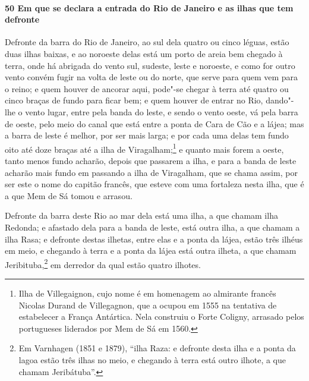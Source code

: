 \begin{linenumbers}
\paragraph{50 Em que se declara a entrada do Rio de Janeiro e as ilhas que tem defronte} \quad
Defronte da barra do Rio de Janeiro, ao sul dela quatro ou cinco léguas, estão duas ilhas
baixas, e ao noroeste delas está um porto de areia bem chegado à terra, onde há abrigada
do vento sul, sudeste, leste e noroeste, e como for outro vento convém fugir na volta de
leste ou do norte, que serve para quem vem para o reino; e quem houver de ancorar aqui,
pode"-se chegar à terra até quatro ou cinco braças de fundo para ficar bem; e quem houver
de entrar no Rio, dando"-lhe o vento lugar, entre pela banda do leste, e sendo o vento
oeste, vá pela barra de oeste, pelo meio do canal que está entre a ponta de Cara de Cão e
a lájea; mas a barra de leste é melhor, por ser mais larga; e por cada uma delas tem fundo
oito até doze braças até a ilha de Viragalham;\footnote{ Ilha de Villegaignon, cujo nome é
em homenagem ao almirante francês Nicolas Durand de Villegagnon, que a ocupou em 1555 na
tentativa de estabelecer a França Antártica. Nela construiu o Forte Coligny, arrasado
pelos portugueses liderados por Mem de Sá em 1560.} e quanto mais forem a oeste, tanto
menos fundo acharão, depois que passarem a ilha, e para a banda de leste acharão mais
fundo em passando a ilha de Viragalham, que se chama assim, por ser este o nome do capitão
francês, que esteve com uma fortaleza nesta ilha, que é a que Mem de Sá tomou e arrasou.

Defronte da barra deste Rio ao mar dela está uma ilha, a que chamam ilha Redonda; e
afastado dela para a banda de leste, está outra ilha, a que chamam a ilha Rasa; e defronte
destas ilhetas, entre elas e a ponta da lájea, estão três ilhéus em meio, e chegando à
terra e a ponta da lájea está outra ilheta, a que chamam Jeribituba,\footnote{ Em
Varnhagen (1851 e 1879), ``ilha Raza: e defronte desta ilha e a ponta da lagoa estão três
ilhas no meio, e chegando à terra está outro ilhote, a que chamam Jeribátuba''.} em
derredor da qual estão quatro ilhotes.


\end{linenumbers}
